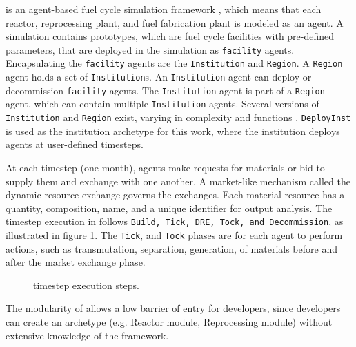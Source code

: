 \Cyclus is an agent-based fuel cycle simulation framework 
\cite{huff_fundamental_2016}, which means 
that each reactor, reprocessing plant, and fuel fabrication plant is modeled as an agent.
A \Cyclus simulation contains prototypes, which are fuel cycle facilities with
pre-defined parameters, that are deployed in the simulation as \texttt{facility} agents.
Encapsulating the \texttt{facility} agents are the \texttt{Institution} and \texttt{Region}.
A \texttt{Region} agent holds a set of \texttt{Institution}s.
An \texttt{Institution} agent can deploy or decommission \texttt{facility} agents.
The \texttt{Institution} agent is part of a \texttt{Region} agent,
which can contain multiple \texttt{Institution} agents. Several versions of \texttt{Institution}
and \texttt{Region} exist, varying in complexity and functions \cite{huff_extensions_2014}.
 \texttt{DeployInst} is used as the institution archetype for this work, where the institution
deploys agents at user-defined timesteps.

At each timestep (one month),
agents make requests for materials or bid to supply them and exchange
with one another. A market-like mechanism called the dynamic resource exchange
\cite{gidden_agent-based_2015} governs the exchanges.
Each material resource has a quantity, composition, name, and a unique identifier
for output analysis. The timestep execution in \Cyclus follows 
\texttt{Build, Tick, \gls{DRE}, Tock, and Decommission}, as illustrated in
figure \ref{fig:time}. The \texttt{Tick}, and \texttt{Tock} phases are for
each agent to perform actions, such as transmutation, separation, generation,
of materials before and after the market exchange phase. 

\begin{figure}[h]
\centering
{}
\caption{\Cyclus timestep execution steps.}
\label{fig:time}
\end{figure}

The modularity of \Cyclus allows a low barrier of
entry for developers, since developers can create an
archetype (e.g. Reactor module, Reprocessing module)
without extensive knowledge of the \Cyclus framework.
